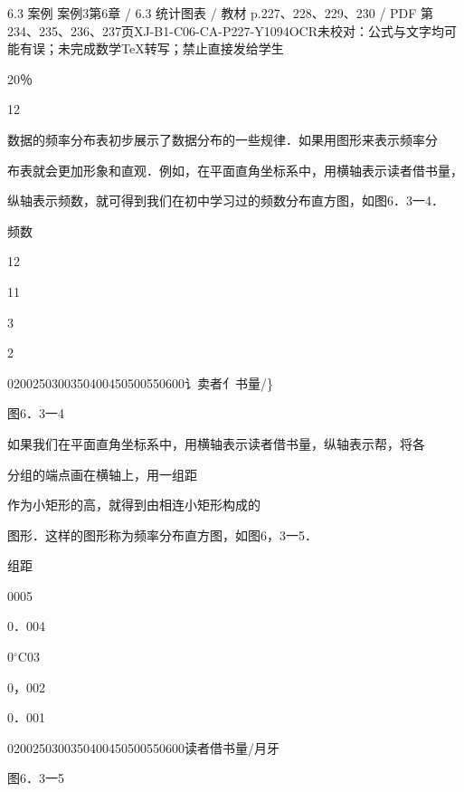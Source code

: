 \begin{bankitem}{6.3 案例 案例3}{第6章 / 6.3 统计图表 / 教材 p.227、228、229、230 / PDF 第234、235、236、237页}{XJ-B1-C06-CA-P227-Y1094}{OCR未校对：公式与文字均可能有误；未完成数学TeX转写；禁止直接发给学生}
\begin{ocrdraft}
20％
\par
12
\par
[450，
\par
1\&3％
\par
500）
\par
11
\par
[500，550）
\par
5％
\par
3
\par
[550，600）
\par
3
\par
5％
\par
100％
\par
表6一3体现了样本数据落在各个小组的比例大小，从中可以看到，借书量在
\par
[350，400）内的天数最多，在[300，350）和[4佣，450）内的天数次之，大部分借书
\par
量集中在[300，500）之间．
\par
[教材p.229 / PDF第236页]
\par
数据的频率分布表初步展示了数据分布的一些规律．如果用图形来表示频率分
\par
布表就会更加形象和直观．例如，在平面直角坐标系中，用横轴表示读者借书量，
\par
纵轴表示频数，就可得到我们在初中学习过的频数分布直方图，如图6．3一4．
\par
频数
\par
12
\par
11
\par
3
\par
2
\par
0200250300350400450500550600讠卖者亻书量/\}
\par
图6．3一4
\par
如果我们在平面直角坐标系中，用横轴表示读者借书量，纵轴表示帮，将各
\par
分组的端点画在横轴上，用一组距
\par
作为小矩形的高，就得到由相连小矩形构成的
\par
图形．这样的图形称为频率分布直方图，如图6，3一5．
\par
组距
\par
0005
\par
0．004
\par
0\ensuremath{{}^\circ\mathrm C}03
\par
0，002
\par
0．001
\par
0200250300350400450500550600读者借书量/月牙
\par
图6．3一5
\par

\end{ocrdraft}
\end{bankitem}

